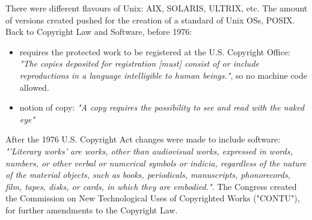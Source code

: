 \documentclass[a4paper, 10pt, titlepage]{article}
\begin{document}
There were different flavours of Unix: AIX, SOLARIS, ULTRIX, etc. The amount of versions created pushed for the creation of a standard of Unix OSs, POSIX. \medskip \\
Back to Copyright Law and Software, before 1976:
\begin{itemize}
\item requires the protected work to be registered at the U.S. Copyright Office: \textit{"The copies deposited for registration [must] consist of or include reproductions in a language intelligible to human beings."}, so no machine code allowed.
\item notion of copy: \textit{"A copy requires the possibility to see and read with the naked eye"}
\end{itemize}
After the 1976 U.S. Copyright Act changes were made to include software: \textit{"'Literary works' are works, other than audiovisual works, expressed in words, numbers, or other verbal or numerical symbols or indicia, regardless of the nature of the material objects, such as books, periodicals, manuscripts, phonorecords, film, tapes, disks, or cards, in which they are embodied."}. The Congress created the Commission on New Technological Uses of Copyrighted Works ("CONTU"), for further amendments to the Copyright Law.
\end{document}
